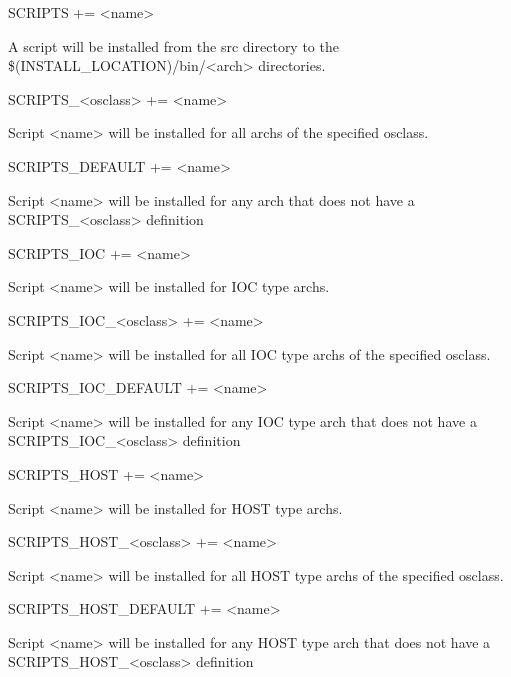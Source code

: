 \begin{description}

\item {}SCRIPTS += \textless{}name\textgreater{}

A script will be installed from the src directory to the \$(INSTALL\_LOCATION)/bin/\textless{}arch\textgreater{} directories.

\item SCRIPTS\_\textless{}osclass\textgreater{} += \textless{}name\textgreater{}

Script \textless{}name\textgreater{} will be installed for all archs of the specified osclass.

\item SCRIPTS\_DEFAULT += \textless{}name\textgreater{}

Script \textless{}name\textgreater{} will be installed for any arch that does not have a SCRIPTS\_\textless{}osclass\textgreater{} definition

\item {}SCRIPTS\_IOC += \textless{}name\textgreater{}

Script \textless{}name\textgreater{} will be installed for IOC type archs.

\item SCRIPTS\_IOC\_\textless{}osclass\textgreater{} += \textless{}name\textgreater{}

Script \textless{}name\textgreater{} will be installed for all IOC type archs of the specified osclass.

\item SCRIPTS\_IOC\_DEFAULT += \textless{}name\textgreater{}

Script \textless{}name\textgreater{} will be installed for any IOC type arch that does not have a SCRIPTS\_IOC\_\textless{}osclass\textgreater{} 
definition

\item {}SCRIPTS\_HOST += \textless{}name\textgreater{}

Script \textless{}name\textgreater{} will be installed for HOST type archs.

\item SCRIPTS\_HOST\_\textless{}osclass\textgreater{} += \textless{}name\textgreater{}

Script \textless{}name\textgreater{} will be installed for all HOST type archs of the specified osclass.

\item SCRIPTS\_HOST\_DEFAULT += \textless{}name\textgreater{}

Script \textless{}name\textgreater{} will be installed for any HOST type arch that does not have a SCRIPTS\_HOST\_\textless{}osclass\textgreater{} 
definition

\end{description}

